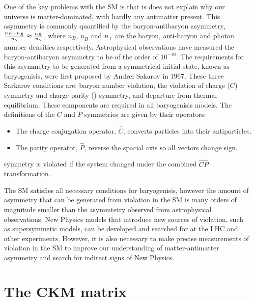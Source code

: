 One of the key problems with the SM is that is does not explain why our universe is matter-dominated, with hardly any antimatter present. This asymmetry is commonly quantified by the baryon-antibaryon asymmetry, $\frac{n_{B} - n_{\bar{B}}}{n_{{\gamma}}} \approx \frac{n_{B}}{n_{{\gamma}}}$, where $n_{B}$, $n_{\bar{B}}$ and $n_{{\gamma}}$ are the baryon, anti-baryon and photon number densities respectively. Astrophysical observations have measured the baryon-antibaryon asymmetry to be of the order of $10^{-10}$. The requirements for this asymmetry to be generated from a symmetrical initial state, known as baryogenisis, were first proposed by Andrei Sakarov in 1967. These three Sarkarov conditions are: baryon number violation, the violation of charge ($C$) symmetry and charge-parity (\CP) symmetry, and departure from thermal equilibrium. These components are required in all baryogenisis models. The definitions of the $C$ and $P$ symmetries are given by their operators:
\begin{itemize}
\item The charge conjugation operator, $\hat{C}$, converts particles into their antiparticles.
\item The parity operator, $\hat{P}$, reverse the spacial axis so all vectors change sign.
\end{itemize}
\CP symmetry is violated if the system changed under the combined $\hat{C}\hat{P}$ transformation.

The SM satisfies all necessary conditions for baryogenisis, however the amount of asymmetry that can be generated from \CP violation in the SM is many orders of magnitude smaller than the asymmtetry observed from astrophysical observations. New Physics models that introduce new sources of \CP violation, such as supersymmetic models, can be developed and searched for at the LHC and other experiments. However, it is also necessary to make precise measurements of \CP violation in the SM to improve our understanding of matter-antimatter asymmetry and search for indirect signs of New Physics.


\section{The CKM matrix}

